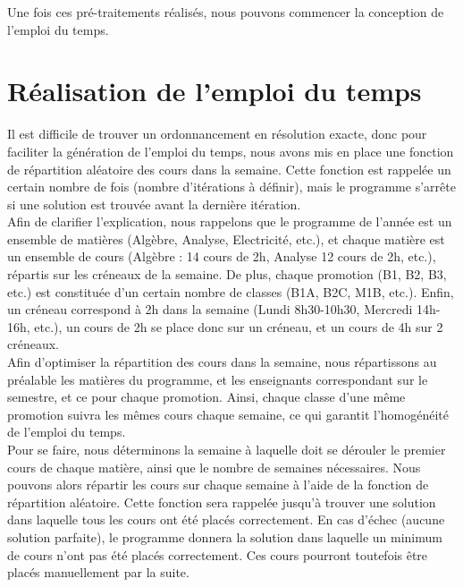 \documentclass[12pt,a4paper,french]{article}
\begin{document}
Une fois ces pré-traitements réalisés, nous pouvons commencer la conception de l'emploi du temps.

\newpage
\section{Réalisation de l'emploi du temps}
Il est difficile de trouver un ordonnancement en résolution exacte, donc pour faciliter la génération de l'emploi du temps, nous avons mis en place une fonction de répartition aléatoire des cours dans la semaine. Cette fonction est rappelée un certain nombre de fois (nombre d'itérations à définir), mais le programme s'arrête si une solution est trouvée avant la dernière itération.\\

Afin de clarifier l'explication, nous rappelons que le programme de l'année est un ensemble de matières (Algèbre, Analyse, Electricité, etc.), et chaque matière est un ensemble de cours (Algèbre : 14 cours de 2h, Analyse 12 cours de 2h, etc.), répartis sur les créneaux de la semaine. De plus, chaque promotion (B1, B2, B3, etc.) est constituée d'un certain nombre de classes (B1A, B2C, M1B, etc.).
Enfin, un créneau correspond à 2h dans la semaine (Lundi 8h30-10h30, Mercredi 14h-16h, etc.), un cours de 2h se place donc sur un créneau, et un cours de 4h sur 2 créneaux.\\

Afin d'optimiser la répartition des cours dans la semaine, nous répartissons au préalable les matières du programme, et les enseignants correspondant sur le semestre, et ce pour chaque promotion. Ainsi, chaque classe d'une même promotion suivra les mêmes cours chaque semaine, ce qui garantit l'homogénéité de l'emploi du temps.\\

Pour se faire, nous déterminons la semaine à laquelle doit se dérouler le premier cours de chaque matière, ainsi que le nombre de semaines nécessaires. Nous pouvons alors répartir les cours sur chaque semaine à l'aide de la fonction de répartition aléatoire. Cette fonction sera rappelée jusqu'à trouver une solution dans laquelle tous les cours ont été placés correctement. En cas d'échec (aucune solution parfaite), le programme donnera la solution dans laquelle un minimum de cours n'ont pas été placés correctement. Ces cours pourront toutefois être placés manuellement par la suite.\\

\newpage
\end{document}
